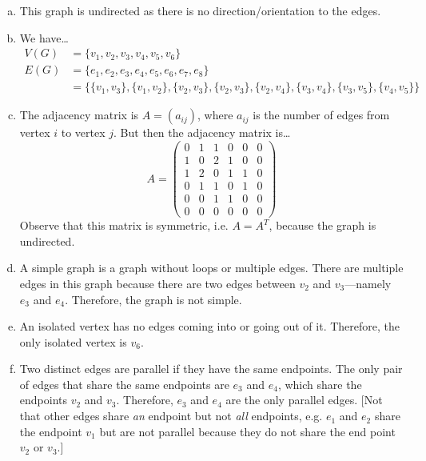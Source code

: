 \documentclass[11pt,letterpaper]{article}
\begin{document}
\sol
\begin{enumerate}[(a)]
\item This graph is undirected as there is no direction/orientation to the edges. 

\item We have\dots
	\[
	\begin{aligned}
	V(G)&= \{ v_1, v_2, v_3, v_4, v_5, v_6 \} \\[0.3cm]
	E(G)&= \{ e_1, e_2, e_3, e_4, e_5, e_6, e_7, e_8 \} \\
	&= \{ \{v_1, v_3\}, \{v_1, v_2\}, \{v_2, v_3\}, \{v_2, v_3\}, \{v_2, v_4\}, \{v_3, v_4\}, \{v_3, v_5\}, \{v_4, v_5\} \}
	\end{aligned}
	\]

\item The adjacency matrix is $A= (a_{ij})$, where $a_{ij}$ is the number of edges from vertex $i$ to vertex $j$. But then the adjacency matrix is\dots
	\[
	A= 
	\begin{pmatrix}
	0 & 1 & 1 & 0 & 0 & 0 \\
	1 & 0 & 2 & 1 & 0 & 0 \\
	1 & 2 & 0 & 1 & 1 & 0 \\
	0 & 1 & 1 & 0 & 1 & 0 \\
	0 & 0 & 1 & 1 & 0 & 0 \\
	0 & 0 & 0 & 0 & 0 & 0 
	\end{pmatrix}
	\]
Observe that this matrix is symmetric, i.e. $A= A^T$, because the graph is undirected. 

\item A simple graph is a graph without loops or multiple edges. There are multiple edges in this graph because there are two edges between $v_2$ and $v_3$---namely $e_3$ and $e_4$. Therefore, the graph is not simple. 

\item An isolated vertex has no edges coming into or going out of it. Therefore, the only isolated vertex is $v_6$. 

\item Two distinct edges are parallel if they have the same endpoints. The only pair of edges that share the same endpoints are $e_3$ and $e_4$, which share the endpoints $v_2$ and $v_3$. Therefore, $e_3$ and $e_4$ are the only parallel edges. [Not that other edges share \textit{an} endpoint but not \textit{all} endpoints, e.g. $e_1$ and $e_2$ share the endpoint $v_1$ but are not parallel because they do not share the end point $v_2$ or $v_3$.]


\end{enumerate}
\end{document}
